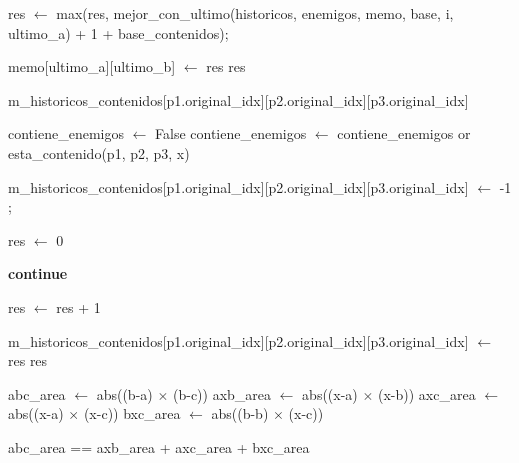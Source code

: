 \begin{algorithmic}
			 
				res $\gets$ max(res, mejor_con_ultimo(historicos, enemigos, memo, base, i, ultimo_a) + 1 + base_contenidos);

			\EndIf

		\EndFor
	\EndIf

	\State memo[ultimo_a][ultimo_b] $\gets$ res
	\State \Return res

\EndFunction

\vspace{2em}

	\State {}
		\State \Return m_historicos_contenidos[p1.original_idx][p2.original_idx][p3.original_idx]
	\EndIf

	\State contiene_enemigos $\gets$ False
		\State contiene_enemigos $\gets$ contiene_enemigos or esta_contenido(p1, p2, p3, x)
	\EndFor

		\State m_historicos_contenidos[p1.original_idx][p2.original_idx][p3.original_idx] $\gets$ -1
        \State {};
	\EndIf

	\State res $\gets$ 0

             \State \textbf{continue}
        \EndIf

        	\State res $\gets$ res + 1
        \EndIf
	\EndFor

	\State m_historicos_contenidos[p1.original_idx][p2.original_idx][p3.original_idx] $\gets$ res
	\State \Return res

\EndFunction

\vspace{2em}

	\State abc_area $\gets$ abs((b-a) $\times$ (b-c))
	\State axb_area $\gets$ abs((x-a) $\times$ (x-b))
	\State axc_area $\gets$ abs((x-a) $\times$ (x-c))
	\State bxc_area $\gets$ abs((b-b) $\times$ (x-c))

	\State \Return abc_area == axb_area + axc_area + bxc_area
\EndFunction

\end{algorithmic}



